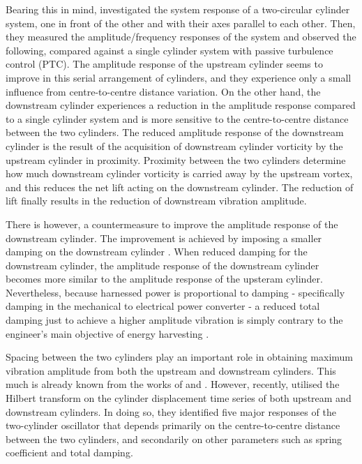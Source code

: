\documentclass[oneside]{utmthesis}
\begin{document}
Bearing this in mind, \citet{Ding2017} investigated the system response of a two-circular cylinder system, one in front of the other and with their axes parallel to each other. Then, they measured the amplitude/frequency responses of the system and observed the following, compared against a single cylinder system with passive turbulence control (PTC). The amplitude response of the upstream cylinder seems to improve in this serial arrangement of cylinders, and they experience only a small influence from centre-to-centre distance variation. On the other hand, the downstream cylinder experiences a reduction in the amplitude response compared to a single cylinder system and is more sensitive to the centre-to-centre distance between the two cylinders. The reduced amplitude response of the downstream cylinder is the result of the acquisition of downstream cylinder vorticity by the upstream cylinder in proximity. Proximity between the two cylinders determine how much downstream cylinder vorticity is carried away by the upstream vortex, and this reduces the net lift acting on the downstream cylinder. The reduction of lift finally results in the reduction of downstream vibration amplitude.

There is however, a countermeasure to improve the amplitude response of the downstream cylinder. The improvement is achieved by imposing a smaller damping on the downstream cylinder \citep{Xu2017}. When \citet{Xu2017} reduced damping for the downstream cylinder, the amplitude response of the downstream cylinder becomes more similar to the amplitude response of the upsteram cylinder. Nevertheless, because harnessed power is proportional to damping - specifically damping in the mechanical to electrical power converter - a reduced total damping just to achieve a higher amplitude vibration is simply contrary to the engineer's main objective of energy harvesting \citet{Bernitsas2008a,Bernitsas2009}.

Spacing between the two cylinders play an important role in obtaining maximum vibration amplitude from both the upstream and downstream cylinders. This much is already known from the works of \citet{Park2016} and \citet{Ding2017}. However, recently, \citet{Yuan2020} utilised the Hilbert transform on the cylinder displacement time series of both upstream and downstream cylinders. In doing so, they identified five major responses of the two-cylinder oscillator that depends primarily on the centre-to-centre distance between the two cylinders, and secondarily on other parameters such as spring coefficient and total damping.
\end{document}
